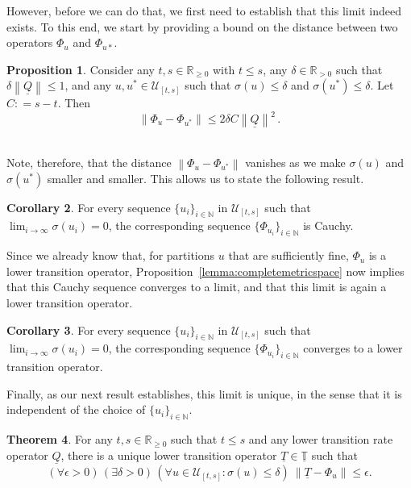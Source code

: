 \documentclass[10pt,a4paper]{paper}
\theoremstyle{definition}
\newtheorem{theorem}{Theorem}[section]
\newtheorem{proposition}[theorem]{Proposition}
\newtheorem{corollary}[theorem]{Corollary}
\newcommand{\nats}{\mathbb{N}}
\newcommand{\reals}{\mathbb{R}}
\newcommand{\realspos}{\reals_{>0}}
\newcommand{\realsnonneg}{\reals_{\geq 0}}
\newcommand{\lt}{\underline{T}}
\newcommand{\lrate}{\underline{Q}}
\newcommand{\norm}[1]{\left\lVert #1 \right\rVert}
\newcommand{\coloneqq}{:\!=}
\begin{document}
However, before we can do that, we first need to establish that this limit indeed exists. To this end, we start by providing a bound on the distance between two operators $\Phi_u$ and $\Phi_{u*}$.

\begin{proposition}\label{prop:differencebetweenu}
Consider any $t,s\in\realsnonneg$ with $t\leq s$, any $\delta\in\realspos$ such that $\delta\norm{\lrate}\leq1$, and any $u,u^*\in\mathcal{U}_{[t,s]}$ such that $\sigma(u)\leq\delta$ and $\sigma(u^*)\leq\delta$. Let $C\coloneqq s-t$. Then
\begin{equation*}
\norm{\Phi_u-\Phi_{u^*}}\leq 2\delta C\norm{\lrate}^2\,.
\end{equation*}\\[-27pt]
\end{proposition}

Note, therefore, that the distance $\norm{\Phi_u - \Phi_{u^*}}$ vanishes as we make $\sigma(u)$ and $\sigma(u^*)$ smaller and smaller. This allows us to state the following result.

\begin{corollary}\label{corol:cauchy}
For every sequence $\{u_i\}_{i\in\nats}$ in $\mathcal{U}_{[t,s]}$ such that $\lim_{i\to\infty}\sigma(u_i)=0$, the corresponding sequence $\{\Phi_{u_i}\}_{i\in\nats}$ is Cauchy.
\end{corollary}

Since we already know that, for partitions $u$ that are sufficiently fine, $\Phi_u$ is a lower transition operator, Proposition~\ref{lemma:completemetricspace} now implies that this Cauchy sequence converges to a limit, and that this limit is again a lower transition operator.

\begin{corollary}\label{corol:limitexistsandiscoherent}
For every sequence $\{u_i\}_{i\in\nats}$ in $\mathcal{U}_{[t,s]}$ such that $\lim_{i\to\infty}\sigma(u_i)=0$, the corresponding sequence $\{\Phi_{u_i}\}_{i\in\nats}$ converges to a lower transition operator.
\end{corollary}

Finally, as our next result establishes, this limit is unique, in the sense that it is independent of the choice of $\{u_i\}_{i\in\nats}$.

\begin{theorem}\label{theo:convergencelowerbound}
For any $t,s\in\realsnonneg$ such that $t\leq s$ and any lower transition rate operator $\lrate$, there is a unique lower transition operator $\lt\in\underline{\mathbb{T}}$ such that 
\begin{equation}\label{eq:theo:convergencelowerbound}
(\forall\epsilon>0)\,
(\exists\delta>0)\,
(\forall u\in\mathcal{U}_{[t,s]}\colon\sigma(u)\leq\delta)~\norm{\lt - \Phi_u}\leq\epsilon.
\end{equation}
\end{theorem}
\end{document}
